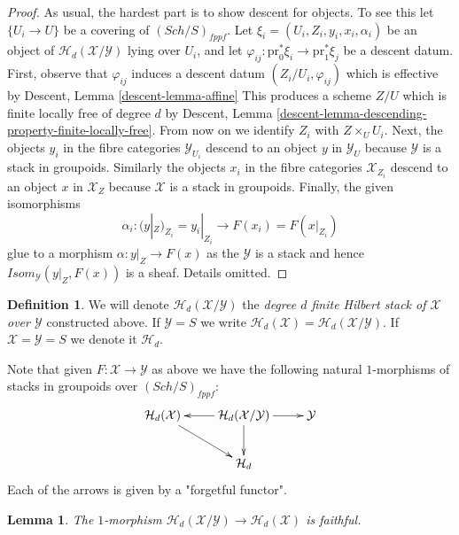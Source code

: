 \documentclass{stacks-project}
\theoremstyle{plain}
\newtheorem{lemma}[subsection]{Lemma}
\theoremstyle{definition}
\newtheorem{definition}[subsection]{Definition}
\theoremstyle{remark}
\numberwithin{equation}{subsection}
\def\Sch{\mathit{Sch}}
\begin{document}
\begin{proof}
As usual, the hardest part is to show descent for objects.
To see this let $\{U_i \to U\}$ be a covering of $(\Sch/S)_{fppf}$.
Let $\xi_i = (U_i, Z_i, y_i, x_i, \alpha_i)$ be an object of
$\mathcal{H}_d(\mathcal{X}/\mathcal{Y})$ lying over $U_i$, and let
$\varphi_{ij} : \text{pr}_0^*\xi_i \to \text{pr}_1^*\xi_j$
be a descent datum. First, observe that $\varphi_{ij}$
induces a descent datum $(Z_i/U_i, \varphi_{ij})$ which is effective by
Descent, Lemma \ref{descent-lemma-affine}
This produces a scheme $Z/U$ which is finite locally free of degree $d$ by
Descent, Lemma \ref{descent-lemma-descending-property-finite-locally-free}.
From now on we identify $Z_i$ with $Z \times_U U_i$.
Next, the objects $y_i$ in the fibre categories $\mathcal{Y}_{U_i}$
descend to an object $y$ in $\mathcal{Y}_U$ because $\mathcal{Y}$ is a
stack in groupoids. Similarly the objects $x_i$ in the fibre categories
$\mathcal{X}_{Z_i}$ descend to an object $x$ in $\mathcal{X}_Z$ because
$\mathcal{X}$ is a stack in groupoids. Finally, the given
isomorphisms
$$
\alpha_i :
(y|_Z)_{Z_i} = y_i|_{Z_i}
\longrightarrow
F(x_i) = F(x|_{Z_i})
$$
glue to a morphism $\alpha : y|_Z \to F(x)$ as the $\mathcal{Y}$
is a stack and hence $\mathit{Isom}_\mathcal{Y}(y|_Z, F(x))$ is
a sheaf. Details omitted.
\end{proof}

\begin{definition}
\label{definition-hilbert-d-stack}
We will denote $\mathcal{H}_d(\mathcal{X}/\mathcal{Y})$
the {\it degree $d$ finite Hilbert stack of $\mathcal{X}$ over $\mathcal{Y}$}
constructed above. If $\mathcal{Y} = S$ we write
$\mathcal{H}_d(\mathcal{X}) = \mathcal{H}_d(\mathcal{X}/\mathcal{Y})$.
If $\mathcal{X} = \mathcal{Y} = S$ we denote it $\mathcal{H}_d$.
\end{definition}

\noindent
Note that given $F : \mathcal{X} \to \mathcal{Y}$ as above we have the
following natural $1$-morphisms of stacks in groupoids over
$(\Sch/S)_{fppf}$:
\begin{equation}
\label{equation-diagram-hilbert-d-stack}
\vcenter{
\xymatrix{
\mathcal{H}_d(\mathcal{X}) \ar[rd] &
\mathcal{H}_d(\mathcal{X}/\mathcal{Y}) \ar[d] \ar[l] \ar[r] &
\mathcal{Y} \\
& \mathcal{H}_d
}
}
\end{equation}
Each of the arrows is given by a "forgetful functor".

\begin{lemma}
\label{lemma-faithful-hilbert}
The $1$-morphism
$\mathcal{H}_d(\mathcal{X}/\mathcal{Y}) \to \mathcal{H}_d(\mathcal{X})$
is faithful.
\end{lemma}
\end{document}
